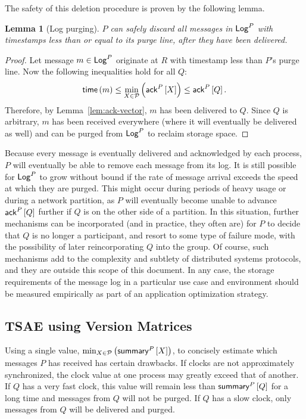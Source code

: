 \documentclass[]             %
{NASA}                       %
\newtheorem{lemma}[theorem]{Lemma}
\theoremstyle{definition}
\begin{document}
The safety of this deletion procedure is proven by the following
lemma.
\begin{lemma}[Log purging]
  \label{lem:purge}
  $P$ can safely discard all messages in $\mathsf{Log}^{P}$ with timestamps less
  than or equal to its purge line, after they have been delivered.
\end{lemma}
\begin{proof}
  Let message $m \in \mathsf{Log}^{P}$ originate at $R$ with timestamp less than
  $P$'s purge line. Now the following inequalities hold for all $Q$:
  \[ \mathsf{time}\left(m\right) \leq \min_{X \in \mathcal{P}}\left(\mathsf{ack}^{P}\left[X\right]\right)
    \leq \mathsf{ack}^{P}\left[Q\right].\] Therefore, by Lemma~\ref{lem:ack-vector}, $m$
  has been delivered to $Q$. Since $Q$ is arbitrary, $m$ has been
  received everywhere (where it will eventually be delivered as well)
  and can be purged from $\mathsf{Log}^{P}$ to reclaim storage space.
\end{proof}

Because every message is eventually delivered and acknowledged by each
process, $P$ will eventually be able to remove each message from its
log. It is still possible for $\mathsf{Log}^{P}$ to grow without bound if the
rate of message arrival exceeds the speed at which they are
purged. This might occur during periods of heavy usage or during a
network partition, as $P$ will eventually become unable to advance
$\mathsf{ack}^{P}\left[Q\right]$ further if $Q$ is on the other side of a partition. In this situation, further mechanisms can be incorporated (and in practice, they often are) for $P$ to decide that $Q$ is no longer a participant, and resort to some type of failure mode, with the possibility of later reincorporating $Q$ into the group. Of course, such mechanisms add to the complexity and subtlety of distributed systems protocols, and they are outside this scope of this document. In any case, the
storage requirements of the message log in a particular use case and
environment should be measured empirically as part of an application
optimization strategy.

\subsection{TSAE using Version Matrices}
\label{ssec:tsae-unsynchronized}
Using a single value,
$\min_{X \in \mathcal{P}} \left(\mathsf{summary}^{P}\left[X\right]\right)$, to concisely
estimate which messages $P$ has received has certain drawbacks. If
clocks are not approximately synchronized, the clock value at one
process may greatly exceed that of another. If $Q$ has a very fast
clock, this value will remain less than $\mathsf{summary}^{P}\left[Q\right]$ for a long
time and messages from $Q$ will not be purged. If $Q$ has a slow
clock, only messages from $Q$ will be delivered and purged.
\end{document}

